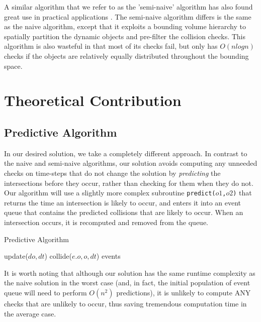 \documentclass[CEJCS,PDF]{cej} %
\begin{document}
A similar algorithm that we refer to as the 'semi-naive' algorithm has also found great use in practical applications \cite{Bittner02hierarchicaltechniques}.  The semi-naive algorithm differs is the same as the naive algorithm, except that it exploits a bounding volume hierarchy to spatially partition the dynamic objects and pre-filter the collision checks.  This algorithm is also wasteful in that most of its checks fail, but only has $O(n log n)$ checks if the objects are relatively equally distributed throughout the bounding space.

\section{Theoretical Contribution}
\label{sec:theocont}
\subsection{Predictive Algorithm}

In our desired solution, we take a completely different approach.  In contrast to the naive and semi-naive algorithms, our solution avoids computing any unneeded checks on time-steps that do not change the solution by \textit{predicting} the intersections before they occur, rather than checking for them when they do not.  Our algorithm will use a slightly more complex subroutine \texttt{predict($o1$,$o2$)} that returns the time an intersection is likely to occur, and enters it into an event queue that contains the predicted collisions that are likely to occur.  When an intersection occurs, it is recomputed and removed from the queue.

\begin{algorithm}
\caption{Predictive Algorithm}
\begin{algorithmic}
\STATE {} %
		\STATE update($do,dt$)  
	\ENDFOR
	\STATE {}
				\STATE collide($e.o, o, dt$) 
			\ENDIF
		\ENDFOR
	\ENDFOR
\ENDFOR
\RETURN events
\end{algorithmic}
\end{algorithm}

It is worth noting that although our solution has the same runtime complexity as the naive solution in the worst case (and, in fact, the initial population of event queue will need to perform $O(n^2)$ predictions), it is unlikely to compute ANY checks that are unlikely to occur, thus saving tremendous computation time in the average case.  
\end{document}
